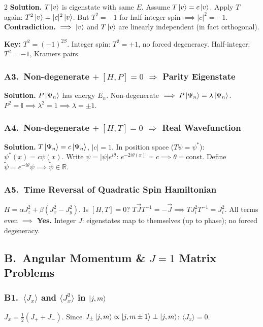 \documentclass[9pt,a4paper]{article} %
\newcommand{\Id}{\mathbb{I}}
\newcommand{\RR}{\mathbb{R}}
\begin{document}
\begin{multicols}{2}
\textbf{Solution.}
$T\ket{v}$ is eigenstate with same $E$.
Assume $T\ket{v}=c\ket{v}$. Apply $T$ again:
$T^2\ket{v}=|c|^2\ket{v}$. But $T^2=-1$ for half-integer spin $\implies |c|^2=-1$. \textbf{Contradiction.}
$\implies \ket{v}$ and $T\ket{v}$ are linearly independent (in fact orthogonal). \checkmark

\textbf{Key:} $T^2=(-1)^{2S}$. Integer spin: $T^2=+1$, no forced degeneracy. Half-integer: $T^2=-1$, Kramers pairs.

\subsubsection{A3.\ Non-degenerate $+\;[H,P]=0$ $\Rightarrow$ Parity Eigenstate}
\textbf{Solution.} $P\ket{\Psi_n}$ has energy $E_n$. Non-degenerate $\implies P\ket{\Psi_n}=\lambda\ket{\Psi_n}$.
$P^2=\Id\implies\lambda^2=1\implies\lambda=\pm 1$. \checkmark

\subsubsection{A4.\ Non-degenerate $+\;[H,T]=0$ $\Rightarrow$ Real Wavefunction}
\textbf{Solution.} $T\ket{\Psi_n}=c\ket{\Psi_n}$, $|c|=1$. In position space ($T\psi=\psi^*$):
$\psi^*(x)=c\psi(x)$. Write $\psi=|\psi|e^{i\theta}$:
$e^{-2i\theta(x)}=c\implies\theta=$const. Define $\tilde\psi=e^{-i\theta}\psi\implies\tilde\psi\in\RR$. \checkmark

\subsubsection{A5.\ Time Reversal of Quadratic Spin Hamiltonian}
$H=\alpha J_z^2+\beta(J_x^2-J_y^2)$. Is $[H,T]=0$?
$T\vec{J}T^{-1}=-\vec{J}\implies TJ_i^2 T^{-1}=J_i^2$. All terms even $\implies$ \textbf{Yes.}
Integer $J$: eigenstates map to themselves (up to phase); no forced degeneracy.

\subsection{B.\ Angular Momentum \& $J=1$ Matrix Problems}

\subsubsection{B1.\ $\langle J_x\rangle$ and $\langle J_x^2\rangle$ in $\ket{j,m}$}
$J_x=\frac{1}{2}(J_++J_-)$. Since $J_\pm\ket{j,m}\propto\ket{j,m\pm 1}\perp\ket{j,m}$:
$\boxed{\langle J_x\rangle=0}$.


\end{multicols}
\end{document}
